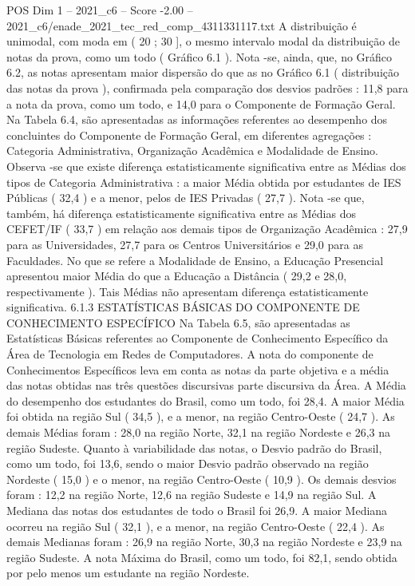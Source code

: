 \begin{textsample}{POS Dim 1 – 2021\_c6 – Score -2.00 – 2021\_c6/enade\_2021\_tec\_red\_comp\_4311331117.txt}
A distribuição é unimodal, com moda em ( 20 ; 30 ], o mesmo intervalo modal da distribuição de notas da prova, como um todo ( Gráfico 6.1 ).
Nota -se, ainda, que, no Gráfico 6.2, as notas apresentam maior dispersão do que as no Gráfico 6.1 ( distribuição das notas da prova ), confirmada pela comparação dos desvios padrões : 11,8 para a nota da prova, como um todo, e 14,0 para o Componente de Formação Geral.
Na Tabela 6.4, são apresentadas as informações referentes ao desempenho dos concluintes do Componente de Formação Geral, em diferentes agregações : Categoria Administrativa, Organização Acadêmica e Modalidade de Ensino.
Observa -se que existe diferença estatisticamente significativa entre as Médias dos tipos de Categoria Administrativa : a maior Média obtida por estudantes de IES Públicas ( 32,4 ) e a menor, pelos de IES Privadas ( 27,7 ).
Nota -se que, também, há diferença estatisticamente significativa entre as Médias dos CEFET/IF ( 33,7 ) em relação aos demais tipos de Organização Acadêmica : 27,9 para as Universidades, 27,7 para os Centros Universitários e 29,0 para as Faculdades.
No que se refere a Modalidade de Ensino, a Educação Presencial apresentou maior Média do que a Educação a Distância ( 29,2 e 28,0, respectivamente ).
Tais Médias não apresentam diferença estatisticamente significativa. 6.1.3 ESTATÍSTICAS BÁSICAS DO COMPONENTE DE CONHECIMENTO ESPECÍFICO Na Tabela 6.5, são apresentadas as Estatísticas Básicas referentes ao Componente de Conhecimento Específico da Área de Tecnologia em Redes de Computadores.
A nota do componente de Conhecimentos Específicos leva em conta as notas da parte objetiva e a média das notas obtidas nas três questões discursivas parte discursiva da Área.
A Média do desempenho dos estudantes do Brasil, como um todo, foi 28,4.
A maior Média foi obtida na região Sul ( 34,5 ), e a menor, na região Centro-Oeste ( 24,7 ).
As demais Médias foram : 28,0 na região Norte, 32,1 na região Nordeste e 26,3 na região Sudeste.
Quanto à variabilidade das notas, o Desvio padrão do Brasil, como um todo, foi 13,6, sendo o maior Desvio padrão observado na região Nordeste ( 15,0 ) e o menor, na região Centro-Oeste ( 10,9 ).
Os demais desvios foram : 12,2 na região Norte, 12,6 na região Sudeste e 14,9 na região Sul.
A Mediana das notas dos estudantes de todo o Brasil foi 26,9.
A maior Mediana ocorreu na região Sul ( 32,1 ), e a menor, na região Centro-Oeste ( 22,4 ).
As demais Medianas foram : 26,9 na região Norte, 30,3 na região Nordeste e 23,9 na região Sudeste.
A nota Máxima do Brasil, como um todo, foi 82,1, sendo obtida por pelo menos um estudante na região Nordeste.

\end{textsample}
